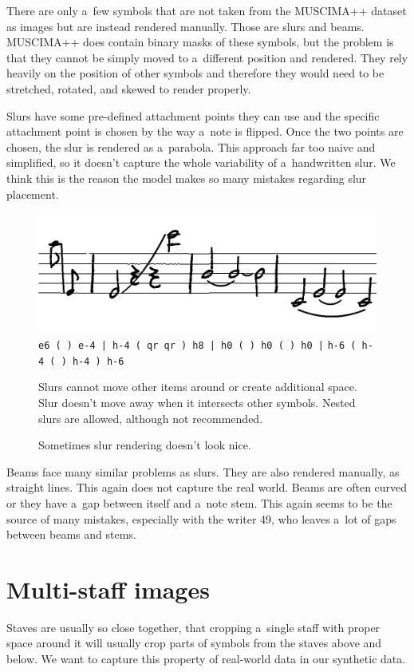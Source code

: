 There are only a~few symbols that are not taken from the MUSCIMA++ dataset as images but are instead rendered manually. Those are slurs and beams. MUSCIMA++ does contain binary masks of these symbols, but the problem is that they cannot be simply moved to a~different position and rendered. They rely heavily on the position of other symbols and therefore they would need to be stretched, rotated, and skewed to render properly.

Slurs have some pre-defined attachment points they can use and the specific attachment point is chosen by the way a~note is flipped. Once the two points are chosen, the slur is rendered as a~parabola. This approach far too naive and simplified, so it doesn't capture the whole variability of a~handwritten slur. We think this is the reason the model makes so many mistakes regarding slur placement.

\begin{figure}[h]
    \centering
    \includegraphics[width=120mm]{../img/failed-slurs}
    \verb`e6 ( ) e-4 | h-4 ( qr qr ) h8 | h0 ( ) h0 ( ) h0 |`
    \verb`h-6 ( h-4 ( ) h-4 ) h-6`
    \caption{Sometimes slur rendering doesn't look nice.}
    \label{fig5:FailedSlurs}
    \medskip
    \small
    Slurs cannot move other items around or create additional space. Slur doesn't move away when it intersects other symbols. Nested slurs are allowed, although not recommended.
\end{figure}

Beams face many similar problems as slurs. They are also rendered manually, as straight lines. This again does not capture the real world. Beams are often curved or they have a~gap between itself and a~note stem. This again seems to be the source of many mistakes, especially with the writer 49, who leaves a~lot of gaps between beams and stems.


\section{Multi-staff images}

Staves are usually so close together, that cropping a~single staff with proper space around it will usually crop parts of symbols from the staves above and below. We want to capture this property of real-world data in our synthetic data.

